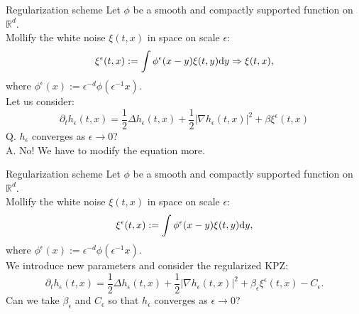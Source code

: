 \documentclass[10pt]{beamer}
\newcommand{\R}{\mathbb{R}}
\newcommand{\e}{\epsilon}
\begin{document}
\begin{frame}{Regularization scheme}
  Let $\phi$ be a smooth and compactly supported  function on $\R^d$. \\
  {\color{red}Mollify} the white noise $\xi(t,x)$ in space on scale $\e$:
  $$\xi^{\e} (t,x):= \int \phi^\e(x-y) \xi(t,y) {\rm d} y\Rightarrow \xi(t,x),$$
  where $\phi^{\e}(x):= \e^{-d} \phi(\e^{-1} x)$.\\
\vspace{4mm}
 Let us consider:
$$\partial_t h_{\e}(t,x)=\frac{1}{2}\Delta h_{\e}(t,x)+\frac{1}{2}\left|\nabla h_{\e}(t,x)\right|^2+\beta \xi^{\e}(t,x)$$
 Q. $h_{\epsilon}$ converges as $\e\to 0$? \pause \hspace{4mm}\\

 \vspace{3mm}
{\color{red} A. No! We have to modify the equation more.}

  \end{frame}

\begin{frame}{Regularization scheme}
  Let $\phi$ be a smooth and  compactly supported  function on $\R^d$. \\
  {\color{red}Mollify} the white noise $\xi(t,x)$ in space on scale $\e$:
  $$\xi^{\e} (t,x):= \int \phi^\e(x-y) \xi(t,y) {\rm d} y,$$
  where $\phi^{\e}(x):= \e^{-d} \phi(\e^{-1} x)$.\\
\vspace{4mm}
 We introduce new parameters and consider the regularized KPZ:
$$\partial_t h_{\e}(t,x)=\frac{1}{2}\Delta h_{\e}(t,x)+\frac{1}{2}\left|\nabla h_{\e}(t,x)\right|^2+\beta_{\e} \xi^{\e}(t,x)-C_{\e}.$$
  Can we take $\beta_{\epsilon}$ and $C_{\epsilon}$ so that $h_{\epsilon}$ converges as $\e\to 0$?
  \end{frame}
\end{document}
